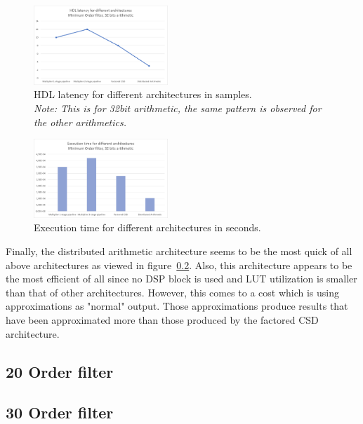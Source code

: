 \begin{figure}[htbp]
	\centering
	\includegraphics[width=0.45\textwidth]{../Images/FIR_min_Order/hdl_latency_32bits.png}
	\caption{HDL latency for different architectures in samples.\\ \textit{Note: This is for 32bit arithmetic, the same pattern is observed for the other arithmetics.}}
	\label{fig:hdl_latency_min_32b}
\end{figure}

\begin{figure}[htpb]
	\centering
	\includegraphics[width=0.45\textwidth]{../Images/FIR_min_Order/exec_time_32bits.png}
	\caption{Execution time for different architectures in seconds.}
	\label{fig:exet_time_min_32b}
\end{figure}

Finally, the distributed arithmetic architecture seems to be the most quick of all above architectures as viewed in figure~\ref{}. Also, this architecture appears to be the most efficient of all since no DSP block is used and LUT utilization is smaller than that of other architectures. However, this comes to a cost which is using approximations as "normal" output. Those approximations produce results that have been approximated more than those produced by the factored CSD architecture.

\subsection{20 Order filter}

\subsection{30 Order filter}
